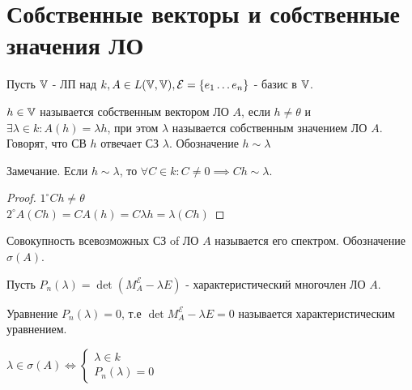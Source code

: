 \documentclass[../main.tex]{subfiles}
\begin{document}
\section{Собственные векторы и собственные значения ЛО}
Пусть $\mathbb{V}$ - ЛП над $k, A\in L(\mathbb{V},\mathbb{V}), \mathcal{E} = \{e_{1} \dots e_{n}\}$ - базис в $\mathbb{V}$.
\begin{definition}
    $h \in \mathbb{V}$ называется собственным вектором ЛО $A$, если $h\neq \theta$ и $\exists \lambda \in k: A(h) = \lambda h$, при этом $\lambda$ называется собственным значением ЛО $A$. Говорят, что СВ $h$ отвечает СЗ $\lambda$. Обозначение $h \sim \lambda$
\end{definition}
Замечание. Если $h \sim \lambda$, то $\forall C \in k : C\neq 0 \implies Ch \sim \lambda$.
\begin{proof}
    $1^{\circ} Ch \neq  \theta$\\ 
    $2^{\circ} A(Ch) = C A(h) = C \lambda h = \lambda (Ch)$
\end{proof}
\begin{definition}
    Совокупность всевозможных СЗ of ЛО $A$ называется его спектром. Обозначение $\sigma(A)$.
\end{definition}
Пусть $P_{n}(\lambda) = \det(M_{A}^{\mathcal{E}}-\lambda E)$ - характеристический многочлен ЛО $A$. 
\begin{definition}
    Уравнение $P_{n}(\lambda)=0$, т.е $\det{M_{A}^{\mathcal{E}}-\lambda E} = 0$ называется характеристическим уравнением. 

\end{definition}
\begin{theorem}
    $\lambda \in \sigma(A) \Leftrightarrow \begin{cases}
        \lambda \in k \\ 
        P_{n}(\lambda) = 0 
    \end{cases}$
\end{theorem}
\end{document}
